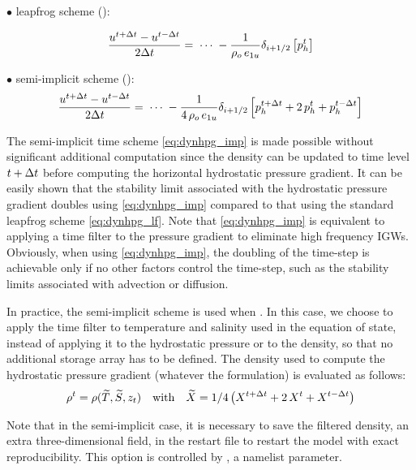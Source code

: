\documentclass[../tex_main/NEMO_manual]{subfiles}
\begin{document}
$\bullet$ leapfrog scheme ():

\begin{equation} \label{eq:dynhpg_lf}
\frac{u^{t+\Delta t}-u^{t-\Delta t}}{2\Delta t} = \;\cdots \;
	-\frac{1}{\rho _o \,e_{1u} }\delta _{i+1/2} \left[ {p_h^t } \right]
\end{equation}

$\bullet$ semi-implicit scheme ():
\begin{equation} \label{eq:dynhpg_imp}
\frac{u^{t+\Delta t}-u^{t-\Delta t}}{2\Delta t} = \;\cdots \;
	-\frac{1}{4\,\rho _o \,e_{1u} } \delta_{i+1/2} \left[ p_h^{t+\Delta t} +2\,p_h^t +p_h^{t-\Delta t}  \right]
\end{equation}

The semi-implicit time scheme \autoref{eq:dynhpg_imp} is made possible without 
significant additional computation since the density can be updated to time level 
$t+\Delta t$ before computing the horizontal hydrostatic pressure gradient. It can 
be easily shown that the stability limit associated with the hydrostatic pressure 
gradient doubles using \autoref{eq:dynhpg_imp} compared to that using the 
standard leapfrog scheme \autoref{eq:dynhpg_lf}. Note that \autoref{eq:dynhpg_imp} 
is equivalent to applying a time filter to the pressure gradient to eliminate high 
frequency IGWs. Obviously, when using \autoref{eq:dynhpg_imp}, the doubling of 
the time-step is achievable only if no other factors control the time-step, such as 
the stability limits associated with advection or diffusion.

In practice, the semi-implicit scheme is used when . 
In this case, we choose to apply the time filter to temperature and salinity used in 
the equation of state, instead of applying it to the hydrostatic pressure or to the 
density, so that no additional storage array has to be defined. The density used to 
compute the hydrostatic pressure gradient (whatever the formulation) is evaluated 
as follows:
\begin{equation} \label{eq:rho_flt}
	\rho^t = \rho( \widetilde{T},\widetilde {S},z_t)
 \quad	  \text{with}	\quad 
	\widetilde{X} = 1 / 4 \left(  X^{t+\Delta t} +2 \,X^t + X^{t-\Delta t}  \right)
\end{equation}

Note that in the semi-implicit case, it is necessary to save the filtered density, an 
extra three-dimensional field, in the restart file to restart the model with exact 
reproducibility. This option is controlled by  , a namelist parameter.
\end{document}
